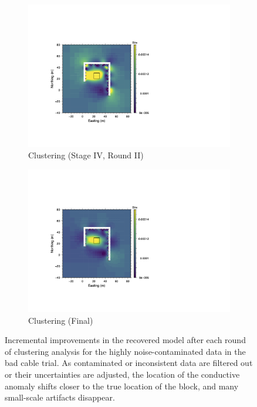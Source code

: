 \documentclass[final,authoryear,5p,times,twocolumn]{elsarticle}
\begin{document}
\begin{figure}[!ht]
   \vspace{1em}

   \begin{subfigure}[b]{0.475\linewidth}
       \centering
       \includegraphics[trim=3.35cm 3.6cm 11.95cm 5.4cm, clip=true, width=\linewidth]{./Figures/Fig23c.png}
       \caption{Clustering (Stage IV, Round II)}
       \label{fig:Synth_Horseshoe_BadCable_ClustStg3}
   \end{subfigure}
   \hfill
   \begin{subfigure}[b]{0.475\linewidth}
       \centering
       \includegraphics[trim=3.35cm 3.6cm 11.95cm 5.4cm, clip=true, width=\linewidth]{./Figures/Fig23d.png}
       \caption{Clustering (Final)}
       \label{fig:Synth_Horseshoe_BadCable_ClustFinal}
   \end{subfigure}

   \caption{Incremental improvements in the recovered model after each round of clustering analysis for the highly noise-contaminated data in the bad cable trial. As contaminated or inconsistent data are filtered out or their uncertainties are adjusted, the location of the conductive anomaly shifts closer to the true location of the block, and many small-scale artifacts disappear.}
   \label{fig:Synth_Horseshoe_BadCable}
\end{figure}
\end{document}
